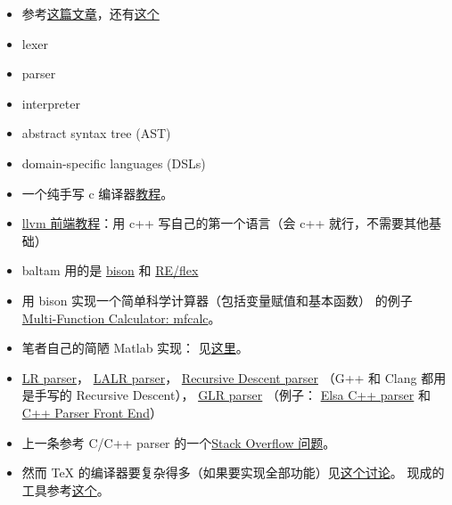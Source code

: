 
\begin{issues}
\issueDraft
\end{issues}

\begin{itemize}
\item 参考\href{https://www.toptal.com/scala/writing-an-interpreter}{这篇文章}，还有\href{https://www.youtube.com/watch?v=Xu4RtLlm42I}{这个}
\item lexer
\item parser
\item interpreter
\item abstract syntax tree (AST)
\item domain-specific languages (DSLs)
\item 一个纯手写 c 编译器\href{https://norasandler.com/2017/11/29/Write-a-Compiler.html}{教程}。
\item \href{https://llvm.org/docs/tutorial/MyFirstLanguageFrontend/index.html}{llvm 前端教程}：用 c++ 写自己的第一个语言（会 c++ 就行，不需要其他基础）
\item baltam 用的是 \href{https://www.gnu.org/software/bison/}{bison} 和 \href{https://www.genivia.com/doc/reflex/html/}{RE/flex}
\item 用 bison 实现一个简单科学计算器（包括变量赋值和基本函数） 的例子 \href{http://web.mit.edu/gnu/doc/html/bison_5.html}{Multi-Function Calculator: mfcalc}。
\item 笔者自己的简陋 Matlab 实现： 见\href{https://github.com/MacroUniverse/bison_test}{这里}。
\item \href{https://en.wikipedia.org/wiki/LR_parser}{LR parser}， \href{https://en.wikipedia.org/wiki/LALR_parser}{LALR parser}， \href{https://en.wikipedia.org/wiki/Recursive_descent_parser}{Recursive Descent parser} （G++ 和 Clang 都用是手写的 Recursive Descent）， \href{https://en.wikipedia.org/wiki/GLR_parser}{GLR parser} （例子： \href{http://www.scottmcpeak.com/elkhound/}{Elsa C++ parser} 和 \href{http://www.semanticdesigns.com/Products/FrontEnds/CppFrontEnd.html}{C++ Parser Front End}）
\item 上一条参考 C/C++ parser 的一个\href{https://stackoverflow.com/questions/6319086/are-gcc-and-clang-parsers-really-handwritten}{Stack Overflow 问题}。
\item 然而 TeX 的编译器要复杂得多（如果要实现全部功能）见\href{https://groups.google.com/g/comp.text.tex/c/E1736iEOxNI}{这个讨论}。 现成的工具参考\href{https://tex.stackexchange.com/questions/39309/convert-latex-to-html}{这个}。
\end{itemize}

